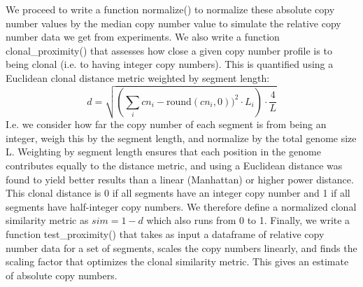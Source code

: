 \documentclass[12pt]{article}\usepackage[]{graphicx}\usepackage[]{color}
\begin{document}
We proceed to write a function normalize() to normalize these absolute copy number values by the median copy number value to simulate the relative copy number data we get from experiments. We also write a function clonal\_proximity() that assesses how close a given copy number profile is to being clonal (i.e. to having integer copy numbers). This is quantified using a Euclidean clonal distance metric weighted by segment length:
\begin{equation*}
d = \sqrt{ ( \sum_i{cn_i - \text{round}(cn_i, 0) )^2 \cdot L_i } ) \cdot \frac{4}{L} }
\end{equation*}
I.e. we consider how far the copy number of each segment is from being an integer, weigh this by the segment length, and normalize by the total genome size L. Weighting by segment length ensures that each position in the genome contributes equally to the distance metric, and using a Euclidean distance was found to yield better results than a linear (Manhattan) or higher power distance. This clonal distance is 0 if all segments have an integer copy number and 1 if all segments have half-integer copy numbers. We therefore define a normalized clonal similarity metric as $sim = 1-d$ which also runs from 0 to 1.
Finally, we write a function test\_proximity() that takes as input a dataframe of relative copy number data for a set of segments, scales the copy numbers linearly, and finds the scaling factor that optimizes the clonal similarity metric. This gives an estimate of absolute copy numbers.
\end{document}

